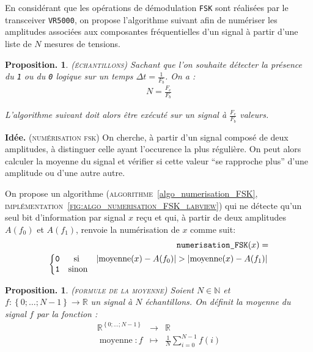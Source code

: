 \documentclass[twocolumn,pre,floats,aps,amsmath,amssymb]{revtex4}
\newtheorem{proposition}[theorem]{Proposition.}
\begin{document}
En consid\'erant que les op\'erations de d\'emodulation \texttt{FSK} sont r\'ealis\'ees par le transceiver \texttt{VR5000}, on propose l'algorithme suivant afin de num\'eriser les amplitudes associ\'ees aux composantes fr\'equentielles d'un signal \`a partir d'une liste de $N$ mesures de tensions.

\begin{proposition}
  \textsc{(\'echantillons)}
  Sachant que l'on souhaite d\'etecter la pr\'esence du \texttt{1} ou du \texttt{0} logique sur un temps $\Delta t = \frac{1}{F_b}$. On a :
  \begin{eqnarray}
    N = \frac{F_e}{F_b}
  \end{eqnarray}

L'algorithme suivant doit alors \^etre ex\'ecut\'e sur un signal \`a $\frac{F_e}{F_b}$ valeurs.
\end{proposition}

\noindent
\textbf{Id\'ee.}
\textsc{(num\'erisation fsk)}
  On cherche, \`a partir d'un signal compos\'e de deux amplitudes, \`a distinguer celle ayant l'occurence la plus r\'eguli\`ere. On peut alors calculer la moyenne du signal et v\'erifier si cette valeur ``se rapproche plus'' d'une amplitude ou d'une autre autre.

On propose un algorithme (\textsc{algorithme}~\ref{algo_numerisation_FSK}, \textsc{impl\'ementation~\ref{fig:algo_numerisation_FSK_labview}}) qui ne d\'etecte qu'un seul bit d'information par signal $x$ re\c{c}u et qui, \`a partir de deux amplitudes $A(f_0)$ et $A(f_1)$, renvoie la num\'erisation de $x$ comme suit:
  \begin{eqnarray*}
    \texttt{numerisation\_FSK} (x) =\\
    \left\{\begin{matrix}
    \texttt{0} &\textup{si }& \left | \operatorname{moyenne}(x) - A(f_0) \right | > \left | \operatorname{moyenne}(x) - A(f_1) \right |\\ 
    \texttt{1} &\textup{sinon}&
    \end{matrix}\right.
  \end{eqnarray*}

\begin{proposition}
  \textsc{(formule de la moyenne)}
  Soient $N \in \mathbb{N}$ et $f : \left \{ 0 ; \dots ; N - 1 \right \} \rightarrow \mathbb{R}$ un signal \`a $N$ \'echantillons. On d\'efinit la moyenne du signal $f$ par la fonction :
  \begin{eqnarray*}
    \mathbb{R}^{\left \{ 0 ; \dots ; N - 1 \right \}} &\rightarrow& \mathbb{R}\\
    \operatorname{moyenne} : f &\mapsto& \frac{1}{N}\sum^{N - 1}_{i = 0}{f(i)}
  \end{eqnarray*}
\end{proposition}
\end{document}
